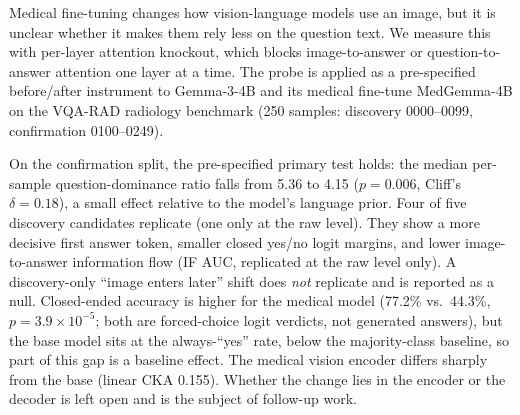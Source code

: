 Medical fine-tuning changes how vision-language models use an image, but it is unclear
whether it makes them rely less on the question text. We measure this with per-layer
attention knockout, which blocks image-to-answer or question-to-answer attention one
layer at a time. The probe is applied as a pre-specified before/after instrument to
Gemma-3-4B and its medical fine-tune MedGemma-4B on the VQA-RAD radiology benchmark
(250 samples: discovery 0000--0099, confirmation 0100--0249).

On the confirmation split, the pre-specified primary test holds: the median per-sample
question-dominance ratio falls from 5.36 to 4.15 ($p{=}0.006$, Cliff's $\delta{=}0.18$),
a small effect relative to the model's language prior. Four of five discovery candidates
replicate (one only at the raw level). They show a more decisive first answer token,
smaller closed yes/no logit margins, and lower image-to-answer information flow (IF AUC,
replicated at the raw level only). A discovery-only ``image enters later'' shift
does \emph{not} replicate and is reported as a null. Closed-ended accuracy is higher for
the medical model (77.2\% vs.\ 44.3\%, $p{=}3.9{\times}10^{-5}$; both are forced-choice
logit verdicts, not generated answers), but the base model sits
at the always-``yes'' rate, below the majority-class baseline, so part of this gap is a
baseline effect. The medical vision encoder differs sharply from the base (linear CKA
0.155). Whether the change lies in the encoder or the decoder is left open and is the
subject of follow-up work.
